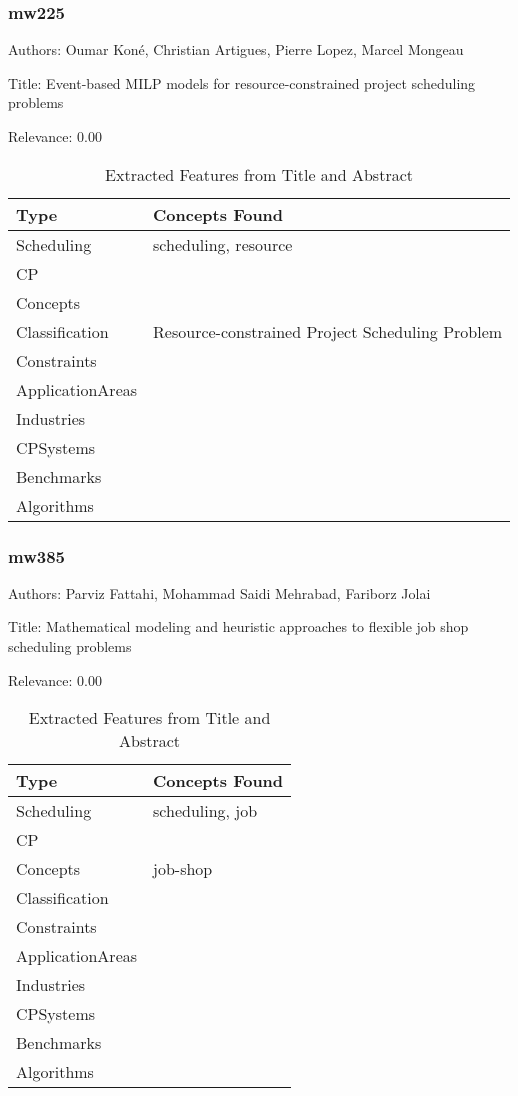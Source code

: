 \subsubsection{mw225}
\label{mw:mw225}

Authors: Oumar Koné, Christian Artigues, Pierre Lopez, Marcel Mongeau

Title: Event-based MILP models for resource-constrained project scheduling problems

Relevance:  0.00

{\scriptsize
\begin{longtable}{p{2cm}p{20cm}}
\caption{Extracted Features from Title and Abstract}\\ \toprule
Type & Concepts Found\\ \midrule
\endhead
\bottomrule
\endfoot
Scheduling & scheduling, resource\\ 
CP & \\ 
Concepts & \\ 
Classification & Resource-constrained Project Scheduling Problem\\ 
Constraints & \\ 
ApplicationAreas & \\ 
Industries & \\ 
CPSystems & \\ 
Benchmarks & \\ 
Algorithms & \\ 
\end{longtable}
}



\subsubsection{mw385}
\label{mw:mw385}

Authors: Parviz Fattahi, Mohammad Saidi Mehrabad, Fariborz Jolai

Title: Mathematical modeling and heuristic approaches to flexible job shop scheduling problems

Relevance:  0.00

{\scriptsize
\begin{longtable}{p{2cm}p{20cm}}
\caption{Extracted Features from Title and Abstract}\\ \toprule
Type & Concepts Found\\ \midrule
\endhead
\bottomrule
\endfoot
Scheduling & scheduling, job\\ 
CP & \\ 
Concepts & job-shop\\ 
Classification & \\ 
Constraints & \\ 
ApplicationAreas & \\ 
Industries & \\ 
CPSystems & \\ 
Benchmarks & \\ 
Algorithms & \\ 
\end{longtable}
}



